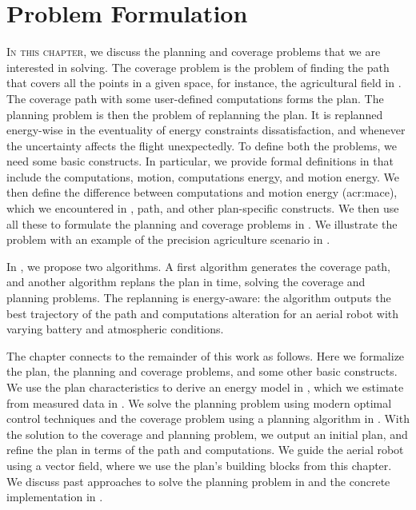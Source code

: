 
\chapter{Problem Formulation}
\label{cp:pb}

\lettrine{I}{n this chapter}, we discuss the planning and coverage problems that we are interested in solving. The coverage problem is the problem of finding the path that covers all the points in a given space, for instance, the agricultural field in . The coverage path with some user-defined computations forms the plan. The planning problem is then the problem of replanning the plan. It is replanned energy-wise in the eventuality of energy constraints dissatisfaction, and whenever the uncertainty affects the flight unexpectedly. To define both the problems, we need some basic constructs. In particular, we provide formal definitions in  that include the computations, motion, computations energy, and motion energy. We then define the difference between computations and motion energy (\Gls{acr:mace}), which we encountered in , path, and other plan-specific constructs. We then use all these to formulate the planning and coverage problems in . We illustrate the problem with an example of the precision agriculture scenario in .

In , we propose two algorithms. A first algorithm generates the coverage path, and another algorithm replans the plan in time, solving the coverage and planning problems. The replanning is energy-aware: the algorithm outputs the best trajectory of the path and computations alteration for an aerial robot with varying battery and atmospheric conditions. 

The chapter connects to the remainder of this work as follows. Here we formalize the plan, the planning and coverage problems, and some other basic constructs. We use the plan characteristics to derive an energy model in , which we estimate from measured data in . We solve the planning problem using modern optimal control techniques and the coverage problem using a planning algorithm in . With the solution to the coverage and planning problem, we output an initial plan, and refine the plan in terms of the path and computations. We guide the aerial robot using a vector field, where we use the plan's building blocks from this chapter. We discuss past approaches to solve the planning problem in  and the concrete implementation in .


